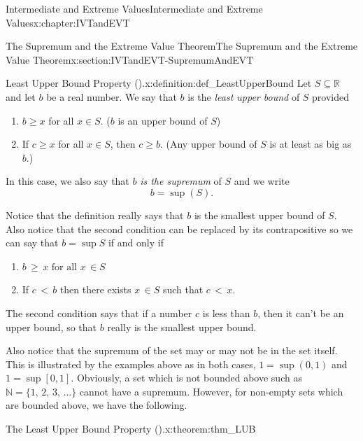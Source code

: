 \begin{chapterptx}{Intermediate and Extreme Values}{}{Intermediate and Extreme Values}{}{}{x:chapter:IVTandEVT}
\begin{sectionptx}{The Supremum and the Extreme Value Theorem}{}{The Supremum and the Extreme Value Theorem}{}{}{x:section:IVTandEVT-SupremumAndEVT}
		\begin{definition}{Least Upper Bound Property ().}{x:definition:def_LeastUpperBound}%
			Let \(S\subseteq\mathbb{R}\) and let \(b\) be a real number.  We say that \(b\) is the \emph{least upper bound} of \(S\) provided%
			\par
			\begin{enumerate}[label=(\alph*)]
				\item{}\(b\geq x\) for all \(x\in S\). (\(b\) is an upper bound of \(S\))%
				\item{}If \(c\geq x\) for all \(x\in S\), then \(c\geq b\). (Any upper bound of \(S\) is at least as big as \(b\).)%
			\end{enumerate}
			\par
			In this case, we also say that \(b\) \emph{is the supremum} of \(S\) and we write%
			\begin{equation*}
				b=\sup\left(S\right)\text{.}
			\end{equation*}
		\end{definition}
		Notice that the definition really says that \(b\) is the smallest upper bound of \(S\). Also notice that the second condition can be replaced by its contrapositive so we can say that \(b=\sup S\) if and only if%
		\begin{enumerate}[label=(\alph*)]
			\item{}\par%
			\(\displaystyle b\,\geq\,x\text{ for all } x\,\in S\)%
			\item{}\par%
			If \(c\,\lt \,b\) then there exists \(x\,\in S\) such that \(c\,\lt \,x\).%
		\end{enumerate}
		\par
		The second condition says that if a number \(c\) is less than \(b\), then it can't be an upper bound, so that \(b\) really is the smallest upper bound.%
		\par
		Also notice that the supremum of the set may or may not be in the set itself. This is illustrated by the examples above as in both cases, \(1=\sup(0,1)\) and \(1=\sup [0,1]\). Obviously, a set which is not bounded above such as \(\mathbb{N}=\{1,\,2,\,3,\,\ldots\}\) cannot have a supremum. However, for non-empty sets which are bounded above, we have the following.%
		\begin{theorem}{The Least Upper Bound Property ().}{}{x:theorem:thm_LUB}%

\end{theorem}
\end{sectionptx}
\end{chapterptx}
